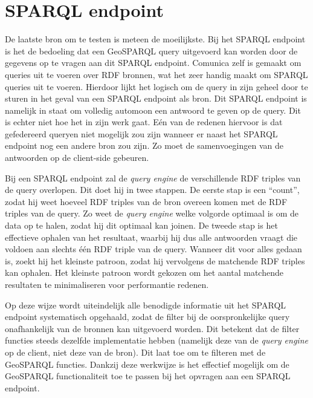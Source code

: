 \section{SPARQL endpoint}
\label{sec:impl_sparql_endpoint}
De laatste bron om te testen is meteen de moeilijkste. Bij het SPARQL endpoint is het de bedoeling dat een GeoSPARQL query uitgevoerd kan worden door de gegevens op te vragen aan dit SPARQL endpoint. Comunica zelf is gemaakt om queries uit te voeren over RDF bronnen, wat het zeer handig maakt om SPARQL queries uit te voeren. Hierdoor lijkt het logisch om de query in zijn geheel door te sturen in het geval van een SPARQL endpoint als bron. Dit SPARQL endpoint is namelijk in staat om volledig automoon een antwoord te geven op de query. Dit is echter niet hoe het in zijn werk gaat. Eén van de redenen hiervoor is dat gefedereerd queryen niet mogelijk zou zijn wanneer er naast het SPARQL endpoint nog een andere bron zou zijn. Zo moet de samenvoegingen van de antwoorden op de client-side gebeuren. 

Bij een SPARQL endpoint zal de \textit{query engine} de verschillende RDF triples van de query overlopen. Dit doet hij in twee stappen. De eerste stap is een ``count'', zodat hij weet hoeveel RDF triples van de bron overeen komen met de RDF triples van de query. Zo weet de \textit{query engine} welke volgorde optimaal is om de data op te halen, zodat hij dit optimaal kan joinen. De tweede stap is het effectieve ophalen van het resultaat, waarbij hij dus alle antwoorden vraagt die voldoen aan slechts één RDF triple van de query. Wanneer dit voor alles gedaan is, zoekt hij het kleinste patroon, zodat hij vervolgens de matchende RDF triples kan ophalen. Het kleinste patroon wordt gekozen om het aantal matchende resultaten te minimaliseren voor performantie redenen.

Op deze wijze wordt uiteindelijk alle benodigde informatie uit het SPARQL endpoint systematisch opgehaald, zodat de filter bij de oorspronkelijke query onafhankelijk van de bronnen kan uitgevoerd worden. Dit betekent dat de filter functies steeds dezelfde implementatie hebben (namelijk deze van de \textit{query engine} op de client, niet deze van de bron). Dit laat toe om te filteren met de GeoSPARQL functies. Dankzij deze werkwijze is het effectief mogelijk om de GeoSPARQL functionaliteit toe te passen bij het opvragen aan een SPARQL endpoint.